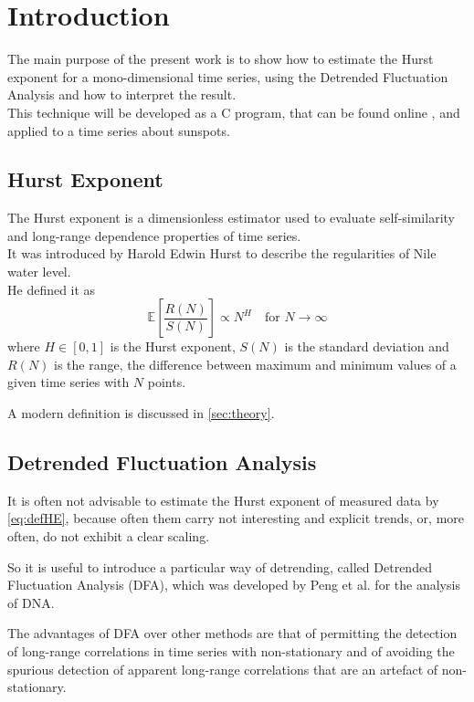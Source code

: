 \section{Introduction} 
The main purpose of the present work is to show how to estimate the Hurst exponent for a mono-dimensional time series, using the Detrended Fluctuation Analysis and how to interpret the result. \\
This technique will be developed as a C program, that can be found online \cite{Foradori}, and applied to a time series about sunspots. 

\subsection{Hurst Exponent}
The Hurst exponent is a dimensionless estimator used to evaluate self-similarity and long-range dependence properties of time series. \\
It was introduced by Harold Edwin Hurst to describe the regularities of Nile water level. \\
He defined it as
\begin{equation}
\mathbb{E} \left[\frac{R(N)}{S(N)}\right] \propto N^{H} \quad \text{for } N \to \infty
\label{eq:defHE}
\end{equation}
where $H \in \left[0, 1 \right] $ is the Hurst exponent, $S (N)$ is the standard deviation and $R(N)$ is the range, the difference between maximum and minimum values of a given time series with $N$ points.

A modern definition is discussed in \autoref{sec:theory}.

\subsection{Detrended Fluctuation Analysis}
It is often not advisable to estimate the Hurst exponent of measured data by \autoref{eq:defHE}, because often them carry not interesting and explicit trends, or, more often, do not exhibit a clear scaling.

So it is useful to introduce a particular way of detrending, called Detrended Fluctuation Analysis (DFA), which was developed by Peng et al. \cite{PhysRevE.49.1685} for the analysis of DNA.

The advantages of DFA over other methods are that of permitting the detection of long-range correlations in time series with non-stationary and of avoiding the spurious detection of apparent long-range correlations that are an artefact of non-stationary.

